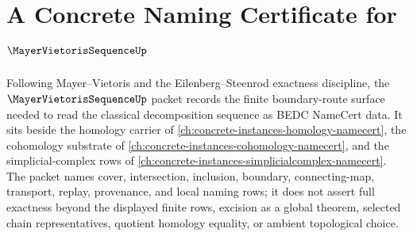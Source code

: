 \chapter{A Concrete Naming Certificate for $\MayerVietorisSequenceUp$}
\label{ch:concrete-instances-mayer-vietoris-sequence-namecert}

Following Mayer--Vietoris and the Eilenberg--Steenrod exactness discipline, the $\MayerVietorisSequenceUp$ packet records the finite boundary-route surface needed to read the classical decomposition sequence as BEDC NameCert data. It sits beside the homology carrier of \autoref{ch:concrete-instances-homology-namecert}, the cohomology substrate of \autoref{ch:concrete-instances-cohomology-namecert}, and the simplicial-complex rows of \autoref{ch:concrete-instances-simplicialcomplex-namecert}. The packet names cover, intersection, inclusion, boundary, connecting-map, transport, replay, provenance, and local naming rows; it does not assert full exactness beyond the displayed finite rows, excision as a global theorem, selected chain representatives, quotient homology equality, or ambient topological choice.

